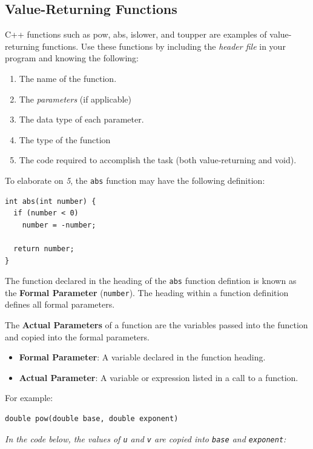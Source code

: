 \documentclass{article}
\begin{document}
\subsection{Value-Returning Functions}
C++ functions such as pow, abs, islower, and toupper are examples of
value-returning functions. Use these functions by including the \textit{header file} in
your program and knowing the following:
\begin{enumerate}
  \item The name of the function.
  \item The \textit{parameters} (if applicable)
  \item The data type of each parameter.
  \item The type of the function
  \item The code required to accomplish the task (both value-returning and void).
\end{enumerate}

To elaborate on \textit{5}, the \texttt{abs} function may have the following
definition:
\begin{lstlisting}[caption={\texttt{abs} Function}]
int abs(int number) {
  if (number < 0)
    number = -number;

  return number;
}
\end{lstlisting}

The function declared in the heading of the \texttt{abs} function defintion is
known as the \textbf{Formal Parameter} (\texttt{number}). The heading within a 
function definition defines all formal parameters.

\vspace{8pt}
The \textbf{Actual Parameters} of a function are the variables passed into the
function and copied into the formal parameters.

\begin{itemize}
  \item \textbf{Formal Parameter}: A variable declared in the function heading.
  \item \textbf{Actual Parameter}: A variable or expression listed in a call to a function.
\end{itemize}

For example:
\begin{lstlisting}[caption={\texttt{pow} Function Header}]
  double pow(double base, double exponent)
\end{lstlisting}

\textit{In the code below, the values of \texttt{u} and \texttt{v} are copied into
\texttt{base} and \texttt{exponent}:}
\end{document}

